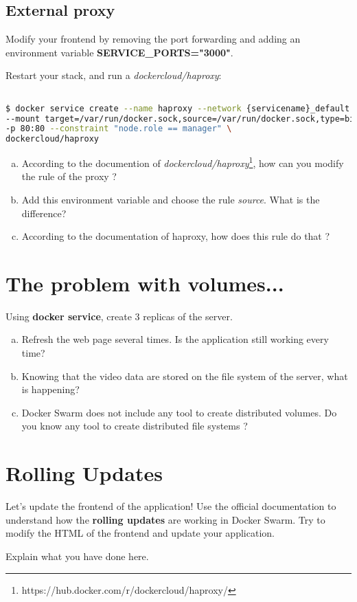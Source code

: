 \documentclass[a4paper,11pt]{exam}
\begin{document}
\subsection{External proxy}

Modify your frontend by removing the port forwarding and adding an environment variable \textbf{SERVICE\_PORTS="3000"}.

Restart your stack, and run a \textit{dockercloud/haproxy}:
\begin{lstlisting}[frame=single,language={sh}]  % Start your code-block

$ docker service create --name haproxy --network {servicename}_default \
--mount target=/var/run/docker.sock,source=/var/run/docker.sock,type=bind \
-p 80:80 --constraint "node.role == manager" \
dockercloud/haproxy

\end{lstlisting}

\begin{questions}
	\question
	\begin{enumerate}[(a)]
		\item According to the documention of \textit{dockercloud/haproxy}\footnote{https://hub.docker.com/r/dockercloud/haproxy/}, how can you modify the rule of the proxy ?
		\item Add this environment variable and choose the rule \textit{source}. What is the difference?
		\item According to the documentation of haproxy, how does this rule do that ?
	\end{enumerate}
\end{questions}


\section{The problem with volumes...}

\begin{questions}
	\question Using \textbf{docker service}, create 3 replicas of the server.
	\begin{enumerate}[(a)]
		\item Refresh the web page several times. Is the application still working every time?
		\item Knowing that the video data are stored on the file system of the server, what is happening?
		\item Docker Swarm does not include any tool to create distributed volumes. Do you know any tool to create distributed file systems ?
	\end{enumerate}
\end{questions}

\section{Rolling Updates}

Let's update the frontend of the application! Use the official documentation to understand how the \textbf{rolling updates} are working in Docker Swarm. Try to modify the HTML of the frontend and update your application.
\begin{questions}
	\question Explain what you have done here.
\end{questions}
\end{document}

